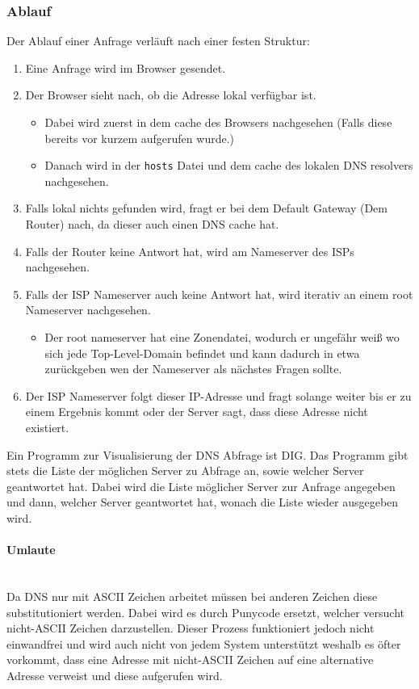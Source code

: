 \documentclass{article}
\newcommand{\paragraphlb}[1]{\paragraph{#1}\mbox{}\\}
\begin{document}
	 \subsubsection{Ablauf}
	 Der Ablauf einer Anfrage verläuft nach einer festen Struktur:
	 \begin{enumerate}
	 	\item{Eine Anfrage wird im Browser gesendet.}
	 	\item{Der Browser sieht nach, ob die Adresse lokal verfügbar ist.}
	 	\begin{itemize}
	 		\item{Dabei wird zuerst in dem cache des Browsers nachgesehen (Falls diese bereits vor kurzem aufgerufen wurde.)}
	 		\item{Danach wird in der \verb|hosts| Datei und dem cache des lokalen DNS resolvers nachgesehen. }
	 	\end{itemize}
	 	\item{Falls lokal nichts gefunden wird, fragt er bei dem Default Gateway (Dem Router) nach, da dieser auch einen DNS cache hat.}
	 	\item{Falls der Router keine Antwort hat, wird am Nameserver des ISPs nachgesehen.}
	 	\item{Falls der ISP Nameserver auch keine Antwort hat, wird iterativ an einem root Nameserver nachgesehen.}
	 	\begin{itemize}
	 		\item{Der root nameserver hat eine Zonendatei, wodurch er ungefähr weiß wo sich jede Top-Level-Domain befindet und kann dadurch in etwa zurückgeben wen der Nameserver als nächstes Fragen sollte.}
	 	\end{itemize}
	 	\item{Der ISP Nameserver folgt dieser IP-Adresse und fragt solange weiter bis er zu einem Ergebnis kommt oder der Server sagt, dass diese Adresse nicht existiert.}
	 \end{enumerate}
	 Ein Programm zur Visualisierung der DNS Abfrage ist DIG. Das Programm gibt stets die Liste der möglichen Server zu Abfrage an, sowie welcher Server geantwortet hat. Dabei wird die Liste möglicher Server zur Anfrage angegeben und dann, welcher Server geantwortet hat, wonach die Liste wieder ausgegeben wird. \\
	 \paragraphlb{Umlaute}
	 Da DNS nur mit ASCII Zeichen arbeitet müssen bei anderen Zeichen diese substitutioniert werden. Dabei wird es durch Punycode ersetzt, welcher versucht nicht-ASCII Zeichen darzustellen. Dieser Prozess funktioniert jedoch nicht einwandfrei und wird auch nicht von jedem System unterstützt weshalb es öfter vorkommt, dass eine Adresse mit nicht-ASCII Zeichen auf eine alternative Adresse verweist und diese aufgerufen wird. \\
\end{document}
